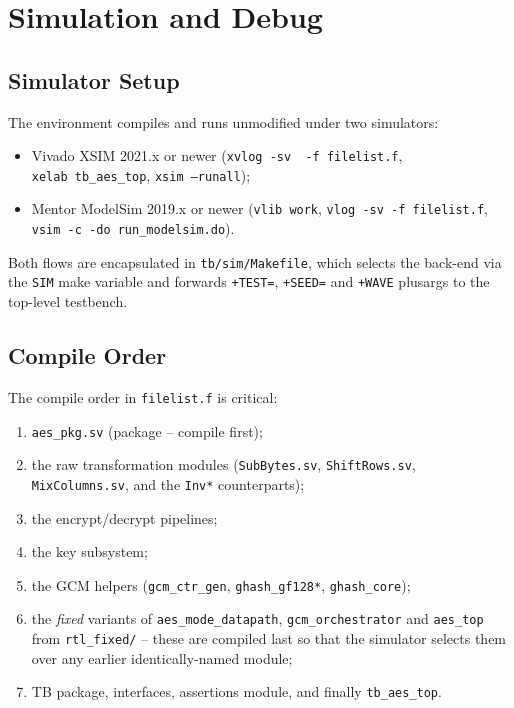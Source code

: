 \documentclass[conference,10pt,a4paper]{IEEEtran}
\begin{document}
\section{Simulation and Debug}
\label{sec:simdebug}

\subsection{Simulator Setup}
The environment compiles and runs unmodified under two simulators:
\begin{itemize}[leftmargin=*]
  \item Vivado XSIM 2021.x or newer
        (\texttt{xvlog~-sv ~-f~filelist.f}, \texttt{xelab~tb\_aes\_top},
        \texttt{xsim~--runall});
  \item Mentor ModelSim 2019.x or newer
        (\texttt{vlib~work}, \texttt{vlog~-sv~-f~filelist.f},
        \texttt{vsim~-c~-do~run\_modelsim.do}).
\end{itemize}
Both flows are encapsulated in \texttt{tb/sim/Makefile}, which selects
the back-end via the \texttt{SIM} make variable and forwards
\texttt{+TEST=}, \texttt{+SEED=} and \texttt{+WAVE} plusargs to the
top-level testbench.

\subsection{Compile Order}
The compile order in \texttt{filelist.f} is critical:
\begin{enumerate}
  \item \texttt{aes\_pkg.sv} (package -- compile first);
  \item the raw transformation modules (\texttt{SubBytes.sv},
        \texttt{ShiftRows.sv}, \texttt{MixColumns.sv}, and the
        \texttt{Inv*} counterparts);
  \item the encrypt/decrypt pipelines;
  \item the key subsystem;
  \item the GCM helpers (\texttt{gcm\_ctr\_gen}, \texttt{ghash\_gf128*},
        \texttt{ghash\_core});
  \item the \emph{fixed} variants of \texttt{aes\_mode\_datapath},
        \texttt{gcm\_orchestrator} and \texttt{aes\_top} from
        \texttt{rtl\_fixed/} -- these are compiled last so that the
        simulator selects them over any earlier identically-named
        module;
  \item TB package, interfaces, assertions module, and finally
        \texttt{tb\_aes\_top}.
\end{enumerate}
\end{document}
